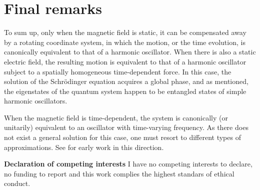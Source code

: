 \documentclass[12pt]{article}
\numberwithin{equation}{section}
\begin{document}
 \section{Final remarks}
 To sum up, only when the magnetic field is static, it can be compensated away by a rotating coordinate system, in which the motion, or the time evolution, is canonically equivalent to that of a harmonic oscillator. When there is also a static electric field, the resulting motion is equivalent to that of a harmonic oscillator subject to a spatially homogeneous time-dependent force. In this case, the solution of the Schr\"{o}dinger equation acquires a global phase, and as mentioned, the eigenstates of the quantum system happen to be entangled states of simple harmonic oscillators.
 
 When the magnetic field is time-dependent, the system is canonically (or unitarily) equivalent to an oscillator with time-varying frequency. As there does not exist a general solution for this case, one must resort to different types of approximations. See \cite {K} for early work in this direction. 
 
 {\bf Declaration of competing interests} I have no competing interests to declare, no funding to report and this work complies the highest standars of ethical conduct.
\end{document}
